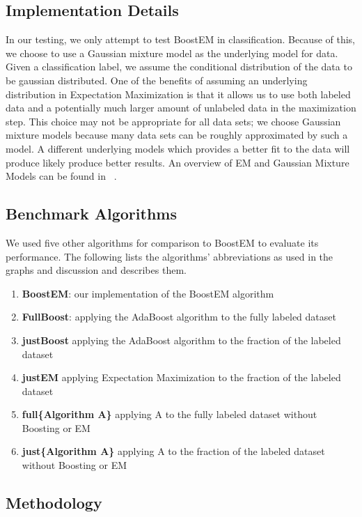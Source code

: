 \documentclass{sig-alternate}
\begin{document}
\subsection{Implementation Details}
In our testing, we only attempt to test BoostEM in classification.  Because of this, we choose to use a Gaussian mixture model as the underlying model for data. Given a classification label, we assume the conditional distribution of the data to be gaussian distributed. One of the benefits of assuming an underlying distribution in Expectation Maximization is that it allows us to use both labeled data and a potentially much larger amount of unlabeled data in the maximization step. This choice may not be appropriate for all data sets; we choose Gaussian mixture models because many data sets can be roughly approximated by such a model.  A different underlying models which provides a better fit to the data will produce likely produce better results.  An overview of EM and Gaussian Mixture Models can be found in ~\cite{zhu2009introduction}.

\subsection{Benchmark Algorithms}

We used five other algorithms for comparison to BoostEM to evaluate its performance. The following lists the algorithms' abbreviations as used in the graphs and discussion and describes them.

\begin{enumerate}
\item \textbf{BoostEM}: our implementation of the BoostEM algorithm
\item \textbf{FullBoost}: applying the AdaBoost algorithm to the fully labeled dataset
\item \textbf{justBoost} applying the AdaBoost algorithm to the fraction of the labeled dataset
\item \textbf{justEM} applying Expectation Maximization to the fraction of the labeled dataset
\item \textbf{full\{Algorithm A\}} applying A to the fully labeled dataset without Boosting or EM
\item \textbf{just\{Algorithm A\}} applying A to the fraction of the labeled dataset without Boosting or EM
\end{enumerate}

\subsection{Methodology}
\end{document}
